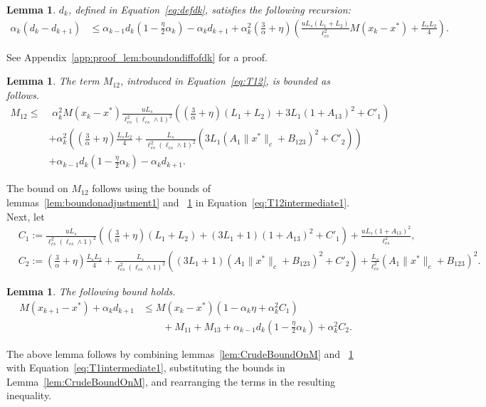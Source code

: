 \documentclass{article}
\newcommand{\lrp}[1]{\left( #1 \right)}
\newcommand{\lcs}{\ell_{cs}}
\newcommand{\xk}{x_k}
\newtheorem{lemma}[theorem]{Lemma}
\begin{document}
\begin{lemma}\label{lem:boundondiffofdk}
$d_k$, defined in Equation~\eqref{eq:defdk}, satisfies the following recursion: 
    \begin{align*}
        \alpha_k(d_k - d_{k+1}) &\le \alpha_{k-1} d_k \lrp{1 - \tfrac{\eta}{2}\alpha_k} - \alpha_k d_{k+1}  +  \alpha^2_k \lrp{\tfrac{3}{\alpha} + \eta}\lrp{\tfrac{uL_s(L_1+L_2)}{\lcs^2} M(x_k-x^*) + \tfrac{L_sL_2}{4}} .
    \end{align*}
\end{lemma}
See Appendix~\ref{app:proof_lem:boundondiffofdk} for a proof. 

\begin{lemma} \label{lem:BoundOnT12}
The term $M_{12}$, introduced in Equation~\eqref{eq:T12}, is bounded as follows. 
\begin{align*}
    M_{12} \le & \,\,\alpha^2_k M(x_k - x^*) \tfrac{u L_s}{\lcs^2\lrp{\lcs\wedge 1}^2} \lrp{\lrp{\tfrac{3}{\alpha} + \eta}(L_1+L_2) + 3L_1 (1+A_{13})^2 + C'_1}\\
    &  + \alpha^2_k \left( \lrp{\tfrac{3}{\alpha} + \eta} \tfrac{L_sL_2}{4} + \tfrac{ L_s }{\lcs^2 \lrp{\lcs \wedge 1}^2}\lrp{3L_1 (A_{1} \|x^*\|_c + B_{123})^2 + C'_2} \right) \\
        & + \alpha_{k-1} d_k \lrp{1 - \tfrac{\eta}{2}\alpha_k} - \alpha_k d_{k+1}. 
\end{align*}
\end{lemma}
The bound on $M_{12}$ follows using the bounds of lemmas~\ref{lem:boundonadjustment1} and ~\ref{lem:boundondiffofdk} in Equation~\eqref{eq:T12intermediate1}. Next, let
\begin{align*}
    &C_1 := \tfrac{u L_s}{\lcs^2\lrp{\lcs\wedge 1}^2} \lrp{\lrp{\tfrac{3}{\alpha} + \eta}(L_1+L_2) + (3L_1+1) (1+A_{13})^2 + C'_1} + \tfrac{u L_s(1+A_{13})^2}{\lcs^2},\\
    &C_2 :=   \lrp{\tfrac{3}{\alpha} + \eta} \tfrac{L_sL_2}{4} + \tfrac{ L_s }{\lcs^2 \lrp{\lcs \wedge 1}^2}\lrp{(3L_1+1) (A_{1} \|x^*\|_c + B_{123})^2 + C'_2} + \tfrac{L_s}{\lcs^2}\lrp{A_1\|x^*\|_c + B_{123}}^2.
\end{align*}

\begin{lemma}\label{lem:rec1beforeexp} The following bound holds.
    \begin{align*}
        M(x_{k+1} - x^*) + \alpha_k d_{k+1} &\le M(\xk - x^*) \lrp{1-\alpha_k \eta + \alpha^2_k C_1 } \\
        &\qquad+ M_{11} + M_{13} + \alpha_{k-1}d_k \lrp{1-\tfrac{\eta}{2}\alpha_k} + \alpha^2_k C_2.
    \end{align*}
\end{lemma}
The above lemma follows by combining lemmas~\ref{lem:CrudeBoundOnM} and ~\ref{lem:BoundOnT12} with Equation~\eqref{eq:T1intermediate1}, substituting the bounds in Lemma~\ref{lem:CrudeBoundOnM}, and rearranging the terms in the resulting inequality. 
\end{document}
